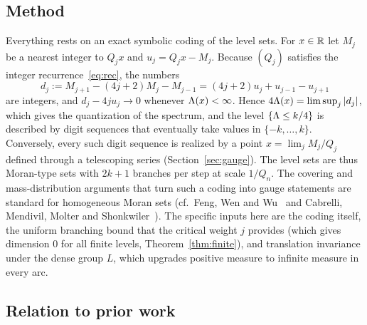 \subsection{Method}

Everything rests on an exact symbolic coding of the level sets. For $x\in\mathbb{R}$
let $M_j$ be a nearest integer to $Q_jx$ and $u_j=Q_jx-M_j$. Because
$(Q_j)$ satisfies the integer recurrence~\eqref{eq:rec}, the numbers
\[
d_j:=M_{j+1}-(4j+2)M_j-M_{j-1}=(4j+2)u_j+u_{j-1}-u_{j+1}
\]
are integers, and $d_j-4ju_j\to0$ whenever $\Lambda(x)<\infty$. Hence
$4\Lambda(x)=\limsup_j|d_j|$, which gives the quantization of the spectrum, and the
level $\{\Lambda\le k/4\}$ is described by digit sequences that eventually take
values in $\{-k,\dots,k\}$. Conversely, every such digit sequence is realized by
a point $x=\lim_jM_j/Q_j$ defined through a telescoping series
(Section~\ref{sec:gauge}). The level sets are thus Moran-type sets with
$2k+1$ branches per step at scale $1/Q_n$. The covering and
mass-distribution arguments that turn such a coding into gauge statements are
standard for homogeneous Moran sets (cf.\ Feng, Wen and Wu~\cite{FWW} and
Cabrelli, Mendivil, Molter and Shonkwiler~\cite{CMMS}). The specific inputs
here are the coding itself, the uniform branching bound that the critical
weight $j$ provides (which gives dimension $0$ for all finite levels,
Theorem~\ref{thm:finite}), and translation invariance under the dense group
$L$, which upgrades positive measure to infinite measure in every arc.

\subsection{Relation to prior work}\label{sec:prior}

